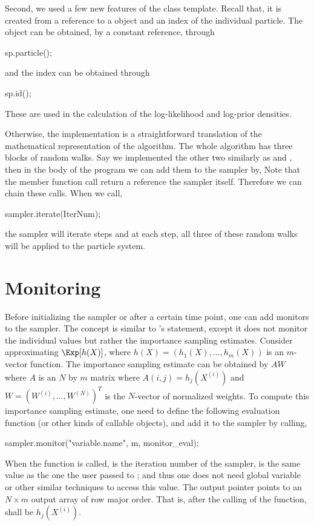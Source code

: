 Second, we used a few new features of the  class
template. Recall that, it is created from a reference to a
 object and an index of the individual particle. The
 object can be obtained, by a constant reference,
through
\begin{cppcode}
sp.particle();
\end{cppcode}
and the index can be obtained through
\begin{cppcode}
sp.id();
\end{cppcode}
These are used in the calculation of the log-likelihood and log-prior
densities.

Otherwise, the implementation is a straightforward translation of the
mathematical representation of the algorithm. The whole algorithm has three
blocks of random walks. Say we implemented the other two similarly as
 and , then in the body
of the program we can add them to the sampler by,
Note that the  member function call return a reference the
sampler itself. Therefore we can chain these calls. When we call,
\begin{cppcode}
sampler.iterate(IterNum);
\end{cppcode}
the sampler will iterate  steps and at each step, all three
of these random walks will be applied to the particle system.

\section{Monitoring}
\label{sec:Monitoring}

Before initializing the sampler or after a certain time point, one can add
monitors to the sampler. The concept is similar to \bugs's 
statement, except it does not monitor the individual values but rather the
importance sampling estimates. Consider approximating $\Exp[h(X)]$, where
$h(X) = (h_1(X),\dots,h_m(X))$ is an $m$-vector function. The importance
sampling estimate can be obtained by $AW$ where $A$ is an $N$ by $m$ matrix
where $A(i,j) = h_j(X^{(i)})$ and $W = (W^{(i)},\dots,W^{(N)})^T$ is the
$N$-vector of normalized weights. To compute this importance sampling
estimate, one need to define the following evaluation function (or other kinds
of callable objects),
and add it to the sampler by calling,
\begin{cppcode}
sampler.monitor("variable.name", m, monitor_eval);
\end{cppcode}
When the function  is called,  is the
iteration number of the sampler,  is the same value as the one
the user passed to ; and thus one does not need
global variable or other similar techniques to access this value. The output
pointer  points to an $N \times m$ output array of row major
order. That is, after the calling of the function,
 shall be $h_j(X^{(i)})$.

